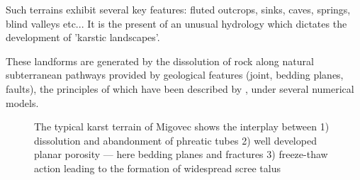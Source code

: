 Such terrains exhibit several key features: fluted outcrops, sinks, caves, springs, blind valleys etc... It is the present of an unusual hydrology which dictates the development of 'karstic landscapes'. 

These landforms are generated by the dissolution of rock along natural subterranean pathways provided by geological features (joint, bedding planes, faults), the principles of which have been described by \citet{dreybrodt1996principles}, under several numerical models.

\begin{figure}[t!]
\checkoddpage \ifoddpage \forcerectofloat \else \forceversofloat \fi
{}
\caption{The typical karst terrain of Migovec shows the interplay between 1) dissolution and abandonment of phreatic tubes 2) well developed planar porosity --- here bedding planes and fractures 3) freeze-thaw action leading to the formation of widespread scree talus }
\label{fig:shaft}
\end{figure}

